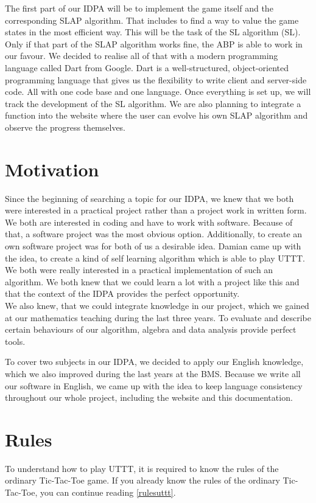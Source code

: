 The first part of our IDPA will be to implement the game itself and the corresponding SLAP algorithm. 
That includes to find a way to value the \acp{game state} in the most efficient way. This will be the task of the \acl{SL} algorithm (\ac{SL}). Only if that part of the \ac{SLAP} algorithm works fine, the \ac{ABP} is able to work in our favour.
We decided to realise all of that with a modern programming language called Dart from Google. Dart is a well-structured, object-oriented programming language that gives us the flexibility to write client and server-side code. All with one code base and one language. Once everything is set up, we will track the development of the \ac{SL} algorithm. We are also planning to integrate a function into the website where the user can evolve his own \ac{SLAP} algorithm and observe the progress themselves.

\section{Motivation}
Since the beginning of searching a topic for our IDPA, we knew that we both were interested in a practical project rather than a  project work in written form. We both are interested in coding and have to work with software. Because of that, a software project was the most obvious option. Additionally, to create an own software project was for both of us a desirable idea.
Damian came up with the idea, to create a kind of self learning algorithm which is able to play \ac{UTTT}. We both were really interested in a practical implementation of such an algorithm. We both knew that we could learn a lot with a project like this and that the context of the IDPA provides the perfect opportunity. \\

We also knew, that we could integrate knowledge in our project, which we gained at our mathematics teaching during the last three years. To evaluate and describe certain behaviours of our algorithm, algebra and data analysis provide perfect tools.

To cover two subjects in our IDPA, we decided to apply our English knowledge, which we also improved during the last years at the BMS. Because we write all our software in English, we came up with the idea to keep language consistency throughout our whole project, including the website and this documentation. 

\section{Rules}
To understand how to play \ac{UTTT}, it is required to  know the rules of the ordinary Tic-Tac-Toe game. If you already know the rules of the ordinary Tic-Tac-Toe, you can continue reading \autoref{rulesuttt}. 

